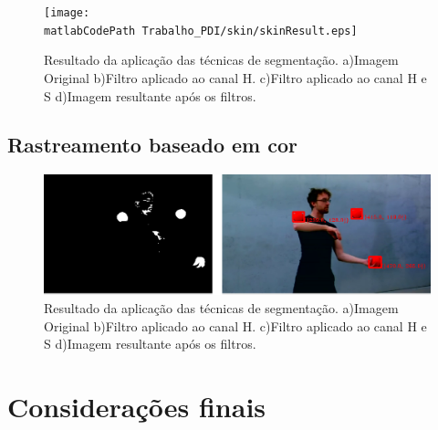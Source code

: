\documentclass[
	article,			%
	11pt,				%
	oneside,			%
	a4paper,			%
	english,			%
	brazil,				%
	sumario=tradicional
	]{abntex2}
\newcommand{\matlabCodePath}{/home/clifte/git/Mestrado/Matlab/}
\begin{document}
\begin{figure} 
		\centering 
		\texttt{[image: \\matlabCodePath
		Trabalho\_PDI/skin/skinResult.eps]}
		\caption{Resultado da aplicação das técnicas de segmentação.
		a)Imagem Original
		b)Filtro aplicado ao canal H.
		c)Filtro aplicado ao canal H e S
		d)Imagem resultante após os filtros.
		}
		\label{fig:skinSegment}		
\end{figure}

\subsection{Rastreamento baseado em cor}
\begin{figure} 
		\centering 
		\includegraphics[width=\textwidth,scale=1, trim =
		4cm 0cm 0cm 1cm,clip]{imagens/track/redBall.png}
		\caption{Resultado da aplicação das técnicas de segmentação.
		a)Imagem Original
		b)Filtro aplicado ao canal H.
		c)Filtro aplicado ao canal H e S
		d)Imagem resultante após os filtros.
		}
		\label{fig:skinSegment}		
\end{figure}
% 

\section*{Considerações finais}



\begin{citacao}

\end{citacao}




 
%
%
\end{document}
